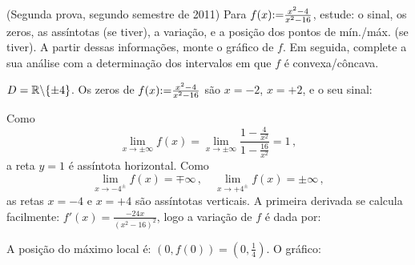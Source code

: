 \begin{exo}(Segunda prova, segundo semestre de 2011)
Para $f(x){:=}\frac{x^2-4}{x^2-16}$, estude:
o sinal, os zeros, as assíntotas
(se tiver), a variação, e a posição dos pontos de mín./máx. (se tiver). A
partir dessas informações, monte o gráfico de $f$. Em seguida,
complete a sua análise com a determinação dos intervalos em que $f$ é
convexa/côncava.
\begin{sol}
$D=\mathbb{R}\backslash \{\pm 4\}$. Os zeros de $f(x){:=}\frac{x^2-4}{x^2-16}$ são
$x=-2$, $x=+2$, e o seu sinal:
\begin{center}
\begin{bmlimage}\end{bmlimage}
\end{center}
Como 
$$
\lim_{x\to \pm\infty}f(x)=\lim_{x\to
\pm \infty}\frac{1-\frac{4}{x^2}}{1-\frac{16}{x^2}}
=1\,,$$
a reta $y=1$ é assíntota horizontal.
Como 
$$
\lim_{x\to -4^\pm}f(x)=\mp \infty\,,\quad \lim_{x\to +4^\pm}f(x)=\pm \infty\,,$$
as retas $x=-4$ e $x=+4$ são assíntotas verticais. 
A primeira derivada se calcula facilmente: $f'(x)=\frac{-24 x }{(x^2-16)^2}$,
logo a variação de $f$ é dada por:
\begin{center}
\begin{bmlimage}\end{bmlimage}
\end{center}
A posição do máximo local é: $(0,f(0))=(0,\tfrac14)$.
O gráfico:
\begin{center}
\begin{bmlimage}
\end{bmlimage}
\end{center}
\end{sol}
\end{exo}
